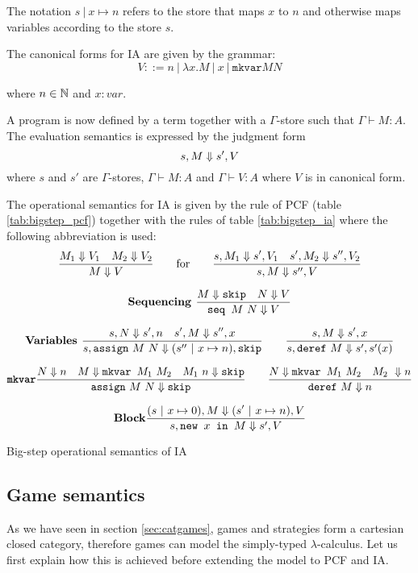 The notation $s\ |\ x \mapsto n$ refers to the store that maps $x$ to $n$
and otherwise maps variables according to the store $s$.


The canonical forms for IA are given by the grammar:
$$ V ::= n\ |\ \lambda x. M\ |\ x\ |\  \texttt{mkvar} M N$$

where $n \in \mathbb{N}$ and $x:var$.


A program is now defined by a term together with a $\Gamma$-store such that $\Gamma \vdash M : A$.
The evaluation semantics is expressed by the judgment form
$$s,M \Downarrow s', V$$
where $s$ and $s'$ are $\Gamma$-stores,
$\Gamma \vdash M : A$ and $\Gamma \vdash V : A$ where $V$ is in canonical form.

The operational semantics for IA is given by the rule of PCF (table \ref{tab:bigstep_pcf})
together with the rules of table \ref{tab:bigstep_ia} where the following abbreviation is used:
$$ \frac{\displaystyle M_1 \Downarrow V_1 \quad M_2 \Downarrow V_2}{M \Downarrow V} \qquad \mbox{for} \qquad
  \frac{\displaystyle s,M_1 \Downarrow s',V_1 \quad s', M_2 \Downarrow s'',V_2 }{s,M \Downarrow s'',V}
$$


\begin{table}[htbp]
$$\mbox{\textbf{Sequencing }}
    \frac{\displaystyle M \Downarrow \texttt{skip} \quad N \Downarrow V}{\texttt{seq } M\ N \Downarrow V}
$$

$$\mbox{\textbf{Variables }}
    \frac{\displaystyle s,N \Downarrow s',n \quad s',M \Downarrow s'',x}{s, \texttt{assign}\ M\ N \Downarrow (s''\ |\ x \mapsto n),\texttt{skip}}
\qquad
    \frac{\displaystyle s,M \Downarrow s',x }{s, \texttt{deref}\ M \Downarrow s',s'(x)}$$

$$\mbox{\texttt{\textbf{mkvar}}}
    \frac{\displaystyle N \Downarrow n \quad M \Downarrow \texttt{mkvar } M_1\ M_2 \quad M_1\ n \Downarrow \texttt{skip}}{\texttt{assign}\ M\ N \Downarrow \texttt{skip}}
\qquad
    \frac{\displaystyle N \Downarrow \texttt{mkvar } M_1\ M_2 \quad M_2\ \Downarrow n}{\texttt{deref}\ M \Downarrow n}
$$

$$\mbox{\textbf{Block}}
    \frac{\displaystyle (s\ |\ x \mapsto 0),M \Downarrow (s'\ |\ x \mapsto n),V }{s, \texttt{new } x \texttt{ in } M \Downarrow s',V}
$$

\label{tab:bigstep_ia}
\caption{Big-step operational semantics of IA}
\end{table}

\subsection{Game semantics}

As we have seen in section \ref{sec:catgames}, games and strategies
form a cartesian closed category, therefore games can model the simply-typed $\lambda$-calculus. Let us first
explain how this is achieved before extending the model to PCF and IA.

